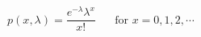 

\[
p(x,\lambda) = \frac{e^{-\lambda}\lambda^{x}} {x!} \;\;\;\;\;\; \mbox{for $x = 0, 1, 2, \cdots $}
\]




